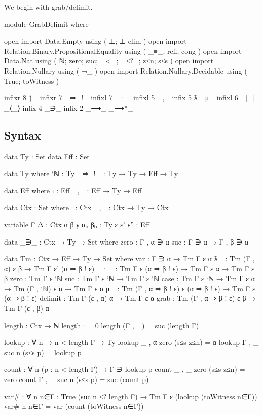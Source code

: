 We begin with grab/delimit.

\begin{code}[hide]
module GrabDelimit where

open import Data.Empty using ( ⊥; ⊥-elim )
open import Relation.Binary.PropositionalEquality using ( _≡_; refl; cong )
open import Data.Nat using ( ℕ; zero; suc; _<_; _≤?_; z≤n; s≤s )
open import Relation.Nullary using ( ¬_ )
open import Relation.Nullary.Decidable using ( True; toWitness )
\end{code}

\begin{code}[hide]
infixr 8 ↑_
infixr 7 _⇒_!_
infixl 7 _·_
infixl 5 _,_
infix  5 ƛ_ μ_
infixl 6 _[_] _⟨_⟩
infix  4 _∋_
infix  2 _⟶_ _⟶*_
\end{code}

\subsection{Syntax}

\begin{code}
data Ty : Set
data Eff : Set

data Ty where
  `ℕ : Ty
  _⇒_!_ : Ty → Ty → Eff → Ty

data Eff where
  ι : Eff
  _,_ : Eff → Ty → Eff

data Ctx : Set where
  ∙ : Ctx
  _,_ : Ctx → Ty → Ctx

variable
  Γ Δ : Ctx
  α β γ αₕ βₕ : Ty
  ε ε' ε'' : Eff

data _∋_ : Ctx → Ty → Set where
  zero : Γ , α ∋ α
  suc : Γ ∋ α → Γ , β ∋ α

data Tm : Ctx → Eff → Ty → Set where
  var : Γ ∋ α → Tm Γ ε α
  ƛ_ : Tm (Γ , α) ε β → Tm Γ ε' (α ⇒ β ! ε)
  _·_ : Tm Γ ε (α ⇒ β ! ε) → Tm Γ ε α → Tm Γ ε β
  zero : Tm Γ ε `ℕ
  suc : Tm Γ ε `ℕ → Tm Γ ε `ℕ
  case : Tm Γ ε `ℕ → Tm Γ ε α → Tm (Γ , `ℕ) ε α → Tm Γ ε α
  μ_ : Tm (Γ , α ⇒ β ! ε) ε (α ⇒ β ! ε) → Tm Γ ε (α ⇒ β ! ε)
  delimit : Tm Γ (ε , α) α → Tm Γ ε α
  grab : Tm (Γ , α ⇒ β ! ε) ε β → Tm Γ (ε , β) α
\end{code}
\begin{code}[hide]
length : Ctx → ℕ
length ∙ = 0
length (Γ , _) = suc (length Γ)

lookup : ∀ {n} → n < length Γ → Ty
lookup {_ , α} {zero} (s≤s z≤n) = α
lookup {Γ , _} {suc n} (s≤s p) = lookup p

count : ∀ {n} (p : n < length Γ) → Γ ∋ lookup p
count {_ , _} {zero} (s≤s z≤n) = zero
count {Γ , _} {suc n} (s≤s p) = suc (count p)

var# : ∀ n {n∈Γ : True (suc n ≤? length Γ)} → Tm Γ ε (lookup (toWitness n∈Γ))
var# n {n∈Γ} = var (count (toWitness n∈Γ))
\end{code}

